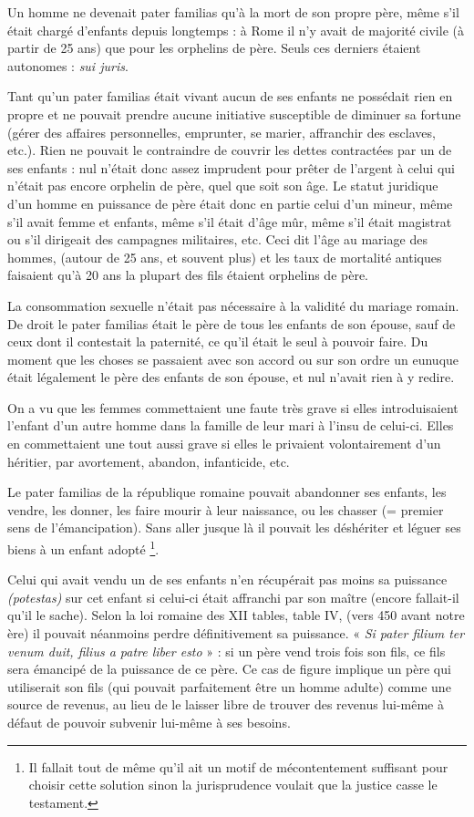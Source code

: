 Un homme ne devenait pater familias qu'à la mort de son propre
père, même s'il était chargé d'enfants depuis longtemps : à Rome il n'y
avait de majorité civile (à partir de 25 ans) que pour les orphelins de père.
Seuls ces derniers étaient autonomes : \emph{sui juris}.

Tant qu'un pater familias était vivant aucun de ses enfants ne possédait
rien en propre et ne pouvait prendre aucune initiative susceptible
de diminuer sa fortune (gérer des affaires personnelles, emprunter, se
marier, affranchir des esclaves, etc.). Rien ne pouvait le contraindre de
couvrir les dettes contractées par un de ses enfants : nul n'était donc assez
imprudent pour prêter de l'argent à celui qui n'était pas encore orphelin
de père, quel que soit son âge. Le statut juridique d'un homme en
puissance de père était donc en partie celui d'un mineur, même s'il avait
femme et enfants, même s'il était d'âge mûr, même s'il était magistrat ou
s'il dirigeait des campagnes militaires, etc. Ceci dit l'âge au mariage des
hommes, (autour de 25 ans, et souvent plus) et les taux de mortalité antiques
faisaient qu'à 20 ans la plupart des fils étaient orphelins de père.

La consommation sexuelle n'était pas nécessaire à la validité du
mariage romain. De droit le pater familias était le père de tous les enfants
de son épouse, sauf de ceux dont il contestait la paternité, ce qu'il était le
seul à pouvoir faire. Du moment que les choses se passaient avec son accord
ou sur son ordre un eunuque était légalement le père des enfants de
son épouse, et nul n'avait rien à y redire.

On a vu que les femmes commettaient une faute très grave si elles
introduisaient l'enfant d'un autre homme dans la famille de leur mari à
l'insu de celui-ci. Elles en commettaient une tout aussi grave si elles le
privaient volontairement d'un héritier, par avortement, abandon, infanticide,
etc.

Le pater familias de la république romaine pouvait abandonner ses
enfants, les vendre, les donner, les faire mourir à leur naissance, ou les
chasser (= premier sens de l'émancipation). Sans aller jusque là il pouvait
les déshériter et léguer ses biens à un enfant adopté%
\footnote{Il fallait tout de même qu'il ait un motif de mécontentement suffisant pour choisir cette solution sinon
la jurisprudence voulait que la justice casse le testament.}.

Celui qui avait vendu un de ses enfants n'en récupérait pas moins
sa puissance \emph{(potestas)} sur cet enfant si celui-ci était affranchi par son maître
(encore fallait-il qu'il le sache). Selon la loi romaine des XII tables, table
IV, (vers 450 avant notre ère) il pouvait néanmoins perdre définitivement
sa puissance. « \emph{Si pater filium ter venum duit, filius a patre liber esto} » :
si un père vend trois fois son fils, ce fils sera émancipé de la puissance de
ce père. Ce cas de figure implique un père qui utiliserait son fils (qui
pouvait parfaitement être un homme adulte) comme une source de revenus,
au lieu de le laisser libre de trouver des revenus lui-même à défaut
de pouvoir subvenir lui-même à ses besoins.

